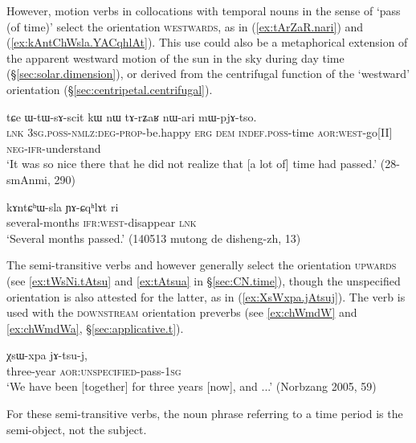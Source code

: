 However, motion verbs in collocations with temporal nouns in the sense of `pass (of time)' select the orientation \textsc{westwards}, as in (\ref{ex:tArZaR.nari}) and (\ref{ex:kAntChWsla.YACqhlAt}). This use could also be a metaphorical extension of the apparent westward motion of the sun in the sky during day time  (§\ref{sec:solar.dimension}), or derived from the centrifugal function of the `westward' orientation 
(§\ref{sec:centripetal.centrifugal}).

\begin{exe}
\ex \label{ex:tArZaR.nari}
\gll   tɕe ɯ-tɯ-sɤ-scit kɯ nɯ tɤ-rʑaʁ nɯ-ari mɯ-pjɤ-tso. \\
\textsc{lnk} \textsc{3sg}.\textsc{poss}-\textsc{nmlz}:\textsc{deg}-\textsc{prop}-be.happy \textsc{erg} \textsc{dem} \textsc{indef}.\textsc{poss}-time \textsc{aor}:\textsc{west}-go[II] \textsc{neg}-\textsc{ifr}-understand \\
\glt  `It was so nice there that he did not realize that [a lot of] time had passed.' (28-smAnmi, 290)
\end{exe}

\begin{exe}
\ex \label{ex:kAntChWsla.YACqhlAt}
\gll kɤntɕʰɯ-sla ɲɤ-ɕqʰlɤt ri \\
several-months \textsc{ifr}:\textsc{west}-disappear \textsc{lnk} \\
\glt `Several months passed.' (140513 mutong de disheng-zh, 13)
\end{exe}

The semi-transitive verbs  and  however generally select the orientation \textsc{upwards} (see \ref{ex:tWsNi.tAtsu} and \ref{ex:tAtsua} in §\ref{sec:CN.time}),  though the unspecified orientation is also attested for the latter, as in (\ref{ex:XsWxpa.jAtsuj}).   The verb  is used with the \textsc{downstream} orientation preverbs (see \ref{ex:chWmdW} and \ref{ex:chWmdWa}, §\ref{sec:applicative.t}).

\begin{exe}
\ex \label{ex:XsWxpa.jAtsuj}
\gll χsɯ-xpa jɤ-tsu-j, \\
three-year \textsc{aor}:\textsc{unspecified}-pass-\textsc{1sg} \\
\glt `We have been [together] for three years [now], and ...' (Norbzang 2005, 59)
\end{exe}
 
For these semi-transitive verbs, the noun phrase referring to a time period is the semi-object, not the subject.

